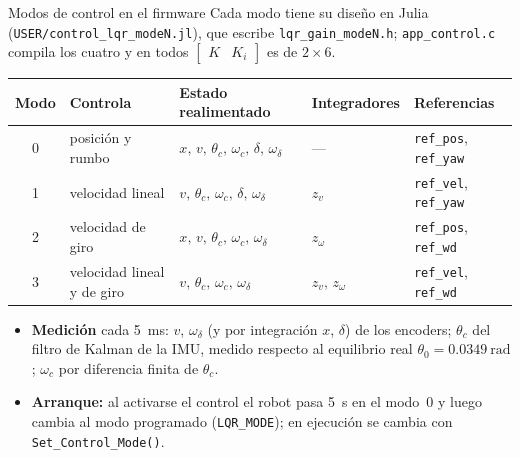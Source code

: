\documentclass[10pt,aspectratio=169]{beamer}
\begin{document}
\begin{frame}{Modos de control en el firmware}
\small
Cada modo tiene su diseño en Julia (\texttt{USER/control\_lqr\_modeN.jl}), que escribe
\texttt{lqr\_gain\_modeN.h}; \texttt{app\_control.c} compila los cuatro y en todos
$\begin{bmatrix}K&K_i\end{bmatrix}$ es de $2\times6$.

\footnotesize
\begin{tabular}{@{}cllll@{}}
\toprule
Modo & Controla & Estado realimentado & Integradores & Referencias\\
\midrule
0 & posición y rumbo & $x,\,v,\,\theta_c,\,\omega_c,\,\delta,\,\omega_\delta$ & --- & \texttt{ref\_pos}, \texttt{ref\_yaw}\\
1 & velocidad lineal & $v,\,\theta_c,\,\omega_c,\,\delta,\,\omega_\delta$ & $z_v$ & \texttt{ref\_vel}, \texttt{ref\_yaw}\\
2 & velocidad de giro & $x,\,v,\,\theta_c,\,\omega_c,\,\omega_\delta$ & $z_\omega$ & \texttt{ref\_pos}, \texttt{ref\_wd}\\
3 & velocidad lineal y de giro & $v,\,\theta_c,\,\omega_c,\,\omega_\delta$ & $z_v,\,z_\omega$ & \texttt{ref\_vel}, \texttt{ref\_wd}\\
\bottomrule
\end{tabular}
\small
\begin{itemize}\setlength{\itemsep}{1pt}
  \item \textbf{Medición} cada \SI{5}{\milli\second}: $v$, $\omega_\delta$ (y por integración
  $x$, $\delta$) de los encoders; $\theta_c$ del filtro de Kalman de la IMU, medido
  respecto al equilibrio real $\theta_0=\SI{0.0349}{\radian}$; $\omega_c$ por diferencia
  finita de $\theta_c$.

  \item \textbf{Arranque:} al activarse el control el robot pasa \SI{5}{\second} en el
  modo~0 y luego cambia al modo programado (\texttt{LQR\_MODE}); en ejecución se cambia con
  \texttt{Set\_Control\_Mode()}.
\end{itemize}
\end{frame}

\end{document}
